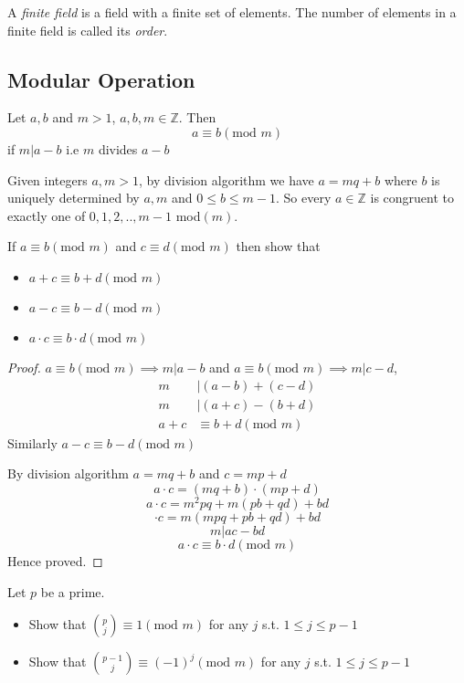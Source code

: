 \begin{definition}
    A \textit{finite field} is a field with a finite set of elements. The number of elements in a finite field is called its \textit{order}.
\end{definition}
\subsection{Modular Operation}
\begin{definition}
    Let $a,b$ and $m > 1$, $a,b,m \in \mathbb{Z}$. Then $$a \equiv b(\textrm{mod } m)$$
    if $m|a-b$ i.e $m$ divides $a-b$
\end{definition}
Given integers $a, m > 1$, by division algorithm we have $a = mq + b$ where $b$
is uniquely determined by $a, m$ and $0 \leq b \leq m-1$. So every $a \in \mathbb{Z}$ is congruent to exactly one of $0, 1, 2, .., m-1$ mod$(m)$.

\begin{exercise}
    If $a \equiv b(\textrm{mod } m)$ and $c \equiv d(\textrm{mod } m)$ then show that
    \begin{itemize}
        \item $a+c \equiv b+d(\textrm{mod } m)$
        \item $a-c \equiv b-d(\textrm{mod } m)$
        \item $a\cdot c \equiv b\cdot d(\textrm{mod } m)$
    \end{itemize}
\end{exercise}
\begin{proof}
    \because \phantom{o} $a \equiv b(\textrm{mod } m) \implies m|a-b$ and $a \equiv b(\textrm{mod } m) \implies m|c-d$, 
    \begin{align*}
        m &|(a-b)+(c-d)\\ 
        m &|(a+c)-(b+d) \\ 
        a+c &\equiv b+d(\textrm{mod } m)
    \end{align*}
    Similarly $a-c \equiv b-d(\textrm{mod } m)$
    
    By division algorithm  $a = mq + b$ and  $c = mp + d$ $$a \cdot c = (mq+b)\cdot(mp+d)$$
    $$a \cdot c = m^{2}pq+m(pb+qd)+bd$$ $$ \cdot c = m(mpq+pb+qd)+bd$$ $$m| 
    ac-bd$$ $$a\cdot c \equiv b\cdot d(\textrm{mod } m)$$
    Hence proved.
\end{proof}

\begin{exercise}
    Let $p$ be a prime.
    \begin{itemize}
        \item Show that $ \binom{p}{j} \equiv 1 (\textrm{mod } m)$ for any $j$ s.t. $1 \leq j \leq p-1$
        \item Show that $ \binom{p-1}{j} \equiv (-1)^{j} (\textrm{mod } m)$ for any $j$ s.t. $1 \leq j \leq p-1$
    \end{itemize}
\end{exercise}

